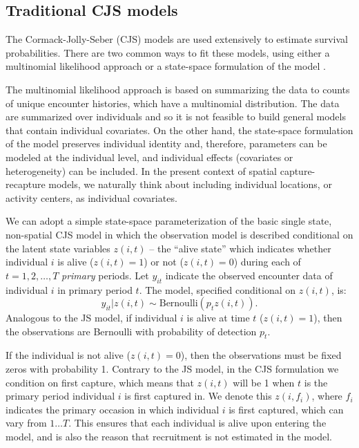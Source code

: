 \subsection{Traditional CJS models}
The Cormack-Jolly-Seber (CJS) models are used extensively
to estimate survival probabilities.  There are two common ways to 
fit these models, using either a
multinomial likelihood approach \citep{lebreton_etal:1992} or a state-space
formulation of the model  \citep{gimenez:2007, royle:2008}.

The multinomial likelihood approach is based on summarizing the data
to counts of unique encounter histories, which have a multinomial
distribution. The data are summarized over individuals and so it is
not feasible to build general models that contain individual
covariates. On the other hand, the state-space formulation of the
model preserves individual identity and, therefore, parameters can be 
modeled at the individual level, and individual effects (covariates or
heterogeneity) can be included. In the present context of spatial
capture-recapture models, we naturally think about including
individual locations, or activity centers, as individual covariates. 


We can adopt a simple state-space parameterization of the
basic single state, non-spatial CJS model in which the observation model is
described conditional on the latent state variables $z(i,t)$ -- the
``alive state'' which indicates whether individual $i$ is
alive ($z(i,t)=1$) or not ($z(i,t)=0$) during each of $t=1,2,\ldots,T$
{\it primary} periods.
Let $y_{it}$ indicate the observed
encounter data of individual $i$ in primary period $t$. The
model, specified conditional on $z(i,t)$, is:
\[
  y_{it}|z(i,t) \sim \mbox{Bernoulli}(p_{t}z(i,t)).
\]
Analogous to the JS model, if individual $i$ is alive at time $t$
($z(i,t)=1$), then the observations are Bernoulli with probability of
detection $p_t$.  

If the individual is not alive ($z(i,t)=0$), then
the observations must be fixed zeros with probability 1.  Contrary to the JS model, in the CJS
formulation we condition on first capture, which
means that $z(i,t)$ will be 1 when $t$ is the primary period individual $i$ is first
captured in.  We denote this $z(i, f_i)$, where $f_i$ indicates the primary
occasion in which individual $i$ is first captured, which can vary
from $1 \dots T$.  This ensures that each individual is alive upon
entering the model, and is also the reason that recruitment is not estimated
in the model.

